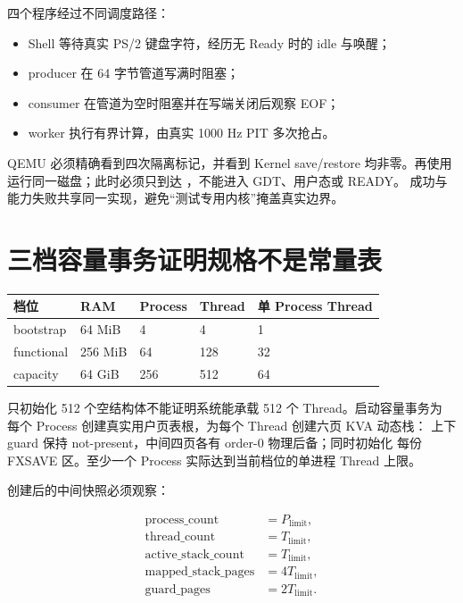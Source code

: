 四个程序经过不同调度路径：

\begin{itemize}
  \item Shell 等待真实 PS/2 键盘字符，经历无 Ready 时的 idle 与唤醒；
  \item producer 在 64 字节管道写满时阻塞；
  \item consumer 在管道为空时阻塞并在写端关闭后观察 EOF；
  \item worker 执行有界计算，由真实 1000 Hz PIT 多次抢占。
\end{itemize}

QEMU 必须精确看到四次隔离标记，并看到 Kernel save/restore 均非零。再使用
 运行同一磁盘；此时必须只到达
，不能进入 GDT、用户态或 READY。
成功与能力失败共享同一实现，避免“测试专用内核”掩盖真实边界。

\section{三档容量事务证明规格不是常量表}

\begin{longtable}{L{0.20\textwidth}L{0.13\textwidth}L{0.16\textwidth}L{0.15\textwidth}L{0.20\textwidth}}
\toprule
档位 & RAM & Process & Thread & 单 Process Thread\\
\midrule
bootstrap & 64 MiB & 4 & 4 & 1\\
functional & 256 MiB & 64 & 128 & 32\\
capacity & 64 GiB & 256 & 512 & 64\\
\bottomrule
\end{longtable}

只初始化 512 个空结构体不能证明系统能承载 512 个 Thread。启动容量事务为
每个 Process 创建真实用户页表根，为每个 Thread 创建六页 KVA 动态栈：
上下 guard 保持 not-present，中间四页各有 order-0 物理后备；同时初始化
每份 FXSAVE 区。至少一个 Process 实际达到当前档位的单进程 Thread 上限。

创建后的中间快照必须观察：

\[
\begin{aligned}
\mathrm{process\_count} &= P_{\mathrm{limit}},\\
\mathrm{thread\_count} &= T_{\mathrm{limit}},\\
\mathrm{active\_stack\_count} &= T_{\mathrm{limit}},\\
\mathrm{mapped\_stack\_pages} &= 4T_{\mathrm{limit}},\\
\mathrm{guard\_pages} &= 2T_{\mathrm{limit}}.
\end{aligned}
\]

